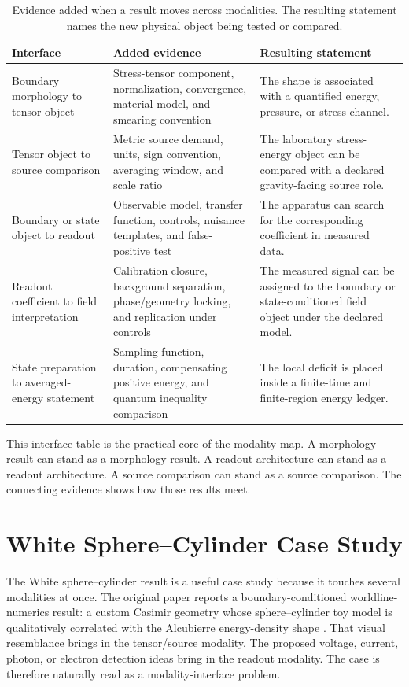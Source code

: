 \documentclass[11pt]{article}
\begin{document}
\begin{table}[h]
\centering
\small
\begin{tabularx}{\textwidth}{p{}p{}X}
\toprule
Interface & Added evidence & Resulting statement \\
\midrule
Boundary morphology to tensor object &
Stress-tensor component, normalization, convergence, material model, and
smearing convention &
The shape is associated with a quantified energy, pressure, or stress channel. \\
\addlinespace
Tensor object to source comparison &
Metric source demand, units, sign convention, averaging window, and scale
ratio &
The laboratory stress-energy object can be compared with a declared
gravity-facing source role. \\
\addlinespace
Boundary or state object to readout &
Observable model, transfer function, controls, nuisance templates, and
false-positive test &
The apparatus can search for the corresponding coefficient in measured data. \\
\addlinespace
Readout coefficient to field interpretation &
Calibration closure, background separation, phase/geometry locking, and
replication under controls &
The measured signal can be assigned to the boundary or state-conditioned field
object under the declared model. \\
\addlinespace
State preparation to averaged-energy statement &
Sampling function, duration, compensating positive energy, and quantum
inequality comparison &
The local deficit is placed inside a finite-time and finite-region energy
ledger. \\
\bottomrule
\end{tabularx}
\caption{Evidence added when a result moves across modalities. The resulting
statement names the new physical object being tested or compared.}
\label{tab:transfers}
\end{table}

This interface table is the practical core of the modality map. A morphology
result can stand as a morphology result. A readout architecture can stand as a
readout architecture. A source comparison can stand as a source comparison.
The connecting evidence shows how those results meet.

\section{White Sphere--Cylinder Case Study}

The White sphere--cylinder result is a useful case study because it touches
several modalities at once. The original paper reports a
boundary-conditioned worldline-numerics result: a custom Casimir geometry
whose sphere--cylinder toy model is qualitatively correlated with the
Alcubierre energy-density shape \cite{White2021}. That visual resemblance
brings in the tensor/source modality. The proposed voltage, current, photon,
or electron detection ideas bring in the readout modality. The case is
therefore naturally read as a modality-interface problem.
\end{document}
